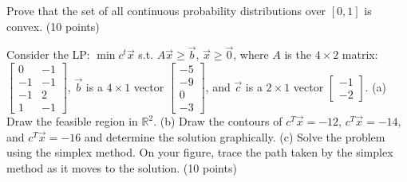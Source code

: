 \documentclass[fleqn]{homework}
\begin{document}
  \begin{problem}{4}
    \begin{question}
      Prove that the set of all continuous probability distributions over
      $[0,1]$ is convex. (10 points)
    \end{question}
  \end{problem}

  \begin{problem}{5}
    \begin{question}
      Consider the LP: $\min c^t \vec{x}$ s.t. $A\vec{x} \geq \vec{b}$,
      $\vec{x} \geq \vec{0}$, where $A$ is the $4 \times 2$ matrix:
      $\begin{bmatrix*} 0 & -1 \\ -1 & -1 \\ -1 & 2 \\ 1 & -1 \end{bmatrix*}$,
      $\vec{b}$ is a $4 \times 1$ vector
      $\begin{bmatrix*} -5 \\ -9 \\ 0 \\ -3 \end{bmatrix*}$, and $\vec{c}$ is a
      $2 \times 1$ vector $\begin{bmatrix*} -1 \\ -2 \end{bmatrix*}$.  (a) Draw
      the feasible region in $\mathbb{R}^2$.  (b) Draw the contours of
      $c^T \vec{x} = -12$, $c^T \vec{x} = -14$, and $c^T \vec{x} = -16$ and
      determine the solution graphically.  (c) Solve the problem using the
      simplex method.  On your figure, trace the path taken by the simplex
      method as it moves to the solution. (10 points)
    \end{question}
  \end{problem}
\end{document}
